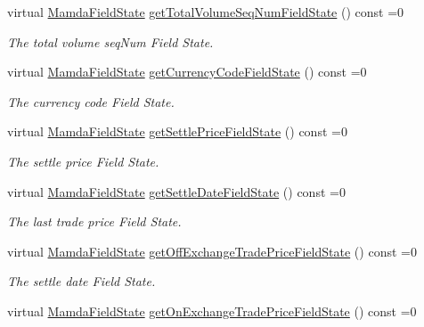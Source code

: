 \begin{CompactItemize}
virtual \hyperlink{namespaceWombat_93aac974f2ab713554fd12a1fa3b7d2a}{Mamda\-Field\-State} \hyperlink{classWombat_1_1MamdaTradeRecap_6a0c576b7c4902e34d3b144cc7120ec4}{get\-Total\-Volume\-Seq\-Num\-Field\-State} () const =0
\begin{CompactList}\small\item\em The total volume seq\-Num Field State. \item\end{CompactList}\item 
virtual \hyperlink{namespaceWombat_93aac974f2ab713554fd12a1fa3b7d2a}{Mamda\-Field\-State} \hyperlink{classWombat_1_1MamdaTradeRecap_f8812af3a07b9b5da681289918a38f73}{get\-Currency\-Code\-Field\-State} () const =0
\begin{CompactList}\small\item\em The currency code Field State. \item\end{CompactList}\item 
virtual \hyperlink{namespaceWombat_93aac974f2ab713554fd12a1fa3b7d2a}{Mamda\-Field\-State} \hyperlink{classWombat_1_1MamdaTradeRecap_a2424806f6356557b09ee35c4fc5c573}{get\-Settle\-Price\-Field\-State} () const =0
\begin{CompactList}\small\item\em The settle price Field State. \item\end{CompactList}\item 
virtual \hyperlink{namespaceWombat_93aac974f2ab713554fd12a1fa3b7d2a}{Mamda\-Field\-State} \hyperlink{classWombat_1_1MamdaTradeRecap_8f2dc16d498df59f741eb2eab59ca95a}{get\-Settle\-Date\-Field\-State} () const =0
\begin{CompactList}\small\item\em The last trade price Field State. \item\end{CompactList}\item 
virtual \hyperlink{namespaceWombat_93aac974f2ab713554fd12a1fa3b7d2a}{Mamda\-Field\-State} \hyperlink{classWombat_1_1MamdaTradeRecap_da82568c7dabc3507fe6a3a8b27324c0}{get\-Off\-Exchange\-Trade\-Price\-Field\-State} () const =0
\begin{CompactList}\small\item\em The settle date Field State. \item\end{CompactList}\item 
virtual \hyperlink{namespaceWombat_93aac974f2ab713554fd12a1fa3b7d2a}{Mamda\-Field\-State} \hyperlink{classWombat_1_1MamdaTradeRecap_f64ddeb0f184484bab7fcb380995b6a5}{get\-On\-Exchange\-Trade\-Price\-Field\-State} () const =0

\end{CompactItemize}
